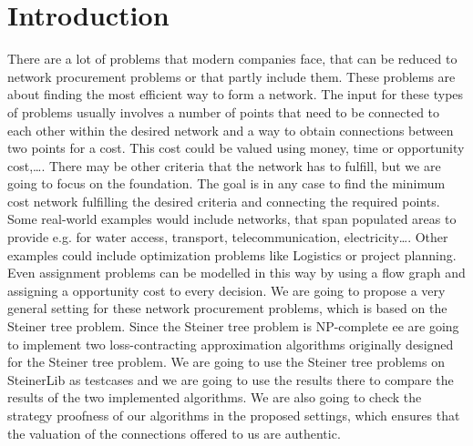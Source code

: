 
\chapter{Introduction}\label{chapter:introduction}

There are a lot of problems that modern companies face, that can be reduced to network procurement problems or that partly include them. These problems are about finding the most efficient way to form a network. The input for these types of problems usually involves a number of points that need to be connected to each other within the desired network and a way to obtain connections between two points for a cost. This cost could be valued using money, time or opportunity cost,\dots . There may be other criteria that the network has to fulfill, but we are going to focus on the foundation. The goal is in any case to find the minimum cost network fulfilling the desired criteria and connecting the required points. 
Some real-world examples would include networks, that span populated areas to provide e.g. for water access, transport, telecommunication, electricity\dots . Other examples could include optimization problems like Logistics or project planning. Even assignment problems can be modelled in this way by using a flow graph and assigning a opportunity cost to every decision. 
We are going to propose a very general setting for these network procurement problems, which is based on the Steiner tree problem. Since the Steiner tree problem is NP-complete ee are going to implement two loss-contracting approximation algorithms originally designed for the Steiner tree problem. We are going to use the Steiner tree problems on SteinerLib \cite{Dui93} as testcases and we are going to use the results there to compare the results of the two implemented algorithms. We are also going to check the strategy proofness of our algorithms in the proposed settings, which ensures that the valuation of the connections offered to us are authentic.  